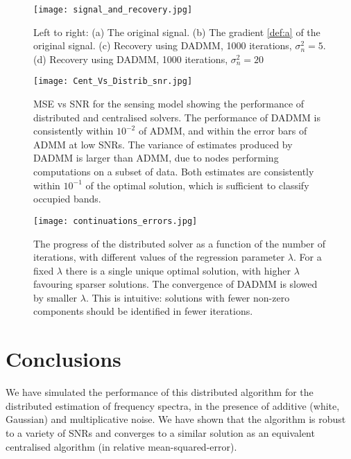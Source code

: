 \begin{figure}[h]
\centering
\texttt{[image: signal\_and\_recovery.jpg]}
\caption{Left to right: (a) The original signal. (b) The gradient \eqref{def:a} of the original signal. (c) Recovery using DADMM, 1000 iterations, \(\sigma^2_n = 5\). (d) Recovery using DADMM, 1000 iterations, \(\sigma^2_n = 20\)  }
\label{different_sigs}
\end{figure}

\begin{figure}[h]
\centering
\texttt{[image: Cent\_Vs\_Distrib\_snr.jpg]}
\caption{MSE vs SNR for the sensing model showing the performance of distributed and centralised solvers. The performance of DADMM is consistently within \(10^{-2}\) of ADMM, and within the error bars of ADMM at low SNRs. The variance of estimates produced by DADMM is larger than ADMM, due to nodes performing computations on a subset of data. Both estimates are consistently within \(10^{-1}\) of the optimal solution, which is sufficient to classify occupied bands.} 
\label{msevssnr0}
\end{figure}

\begin{figure}[h]
\centering
\texttt{[image: continuations\_errors.jpg]}
\caption{The progress of the distributed solver as a function of the number of iterations, with different values of the regression parameter \( \lambda \). For a fixed \( \lambda \) there is a single unique optimal solution, with higher \( \lambda \) favouring sparser solutions. The convergence of DADMM is slowed by smaller \( \lambda \). This is intuitive: solutions with fewer non-zero components should be identified in fewer iterations.}
\label{fig:differentLambda}
\end{figure}

\section{Conclusions}
We have simulated the performance of this distributed algorithm for the distributed estimation of frequency spectra, in the presence of additive (white, Gaussian) and multiplicative noise. We have shown that the algorithm is robust to a variety of SNRs and converges to a similar solution as an equivalent centralised algorithm (in relative mean-squared-error).